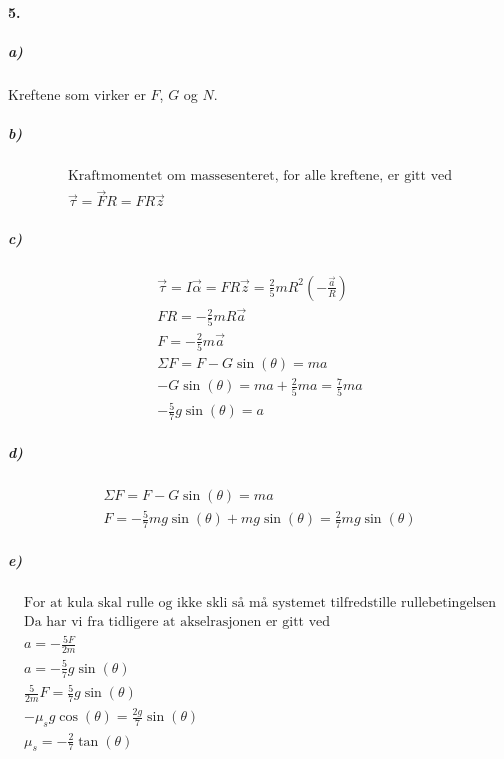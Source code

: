\documentclass[11pt, A4paper,norsk]{article}
\begin{document}
		\paragraph{5.}
			\subparagraph{a)}
				\begin{flushleft}
Kreftene som virker er $F$, $G$ og $N$.
				\end{flushleft}









			\subparagraph{b)}
				\begin{gather*}
\text{Kraftmomentet om massesenteret, for alle kreftene, er gitt ved} \\
\vec{\tau} = \vec{F}R = F R \vec{z}
				\end{gather*}









			\subparagraph{c)}
				\begin{gather*}
\vec{\tau} = I \vec{\alpha} = FR \vec{z} = \frac{2}{5} m R^2 \left( - \frac{\vec{a}}{R} \right) \\
FR = - \frac{2}{5} m R \vec{a} \\
F = - \frac{2}{5} m \vec{a} \\
\Sigma F = F - G \sin(\theta) = ma \\
- G \sin(\theta) = ma + \frac{2}{5} ma = \frac{7}{5} ma \\
- \frac{5}{7} g \sin(\theta) = a
				\end{gather*}









			\subparagraph{d)}
				\begin{gather*}
\Sigma F = F - G \sin(\theta) = ma \\
F = - \frac{5}{7} mg \sin(\theta) + mg \sin(\theta) = \frac{2}{7} mg \sin(\theta)
				\end{gather*}









			\subparagraph{e)}
				\begin{gather*}
\text{For at kula skal rulle og ikke skli så må systemet tilfredstille rullebetingelsen} \\
\text{Da har vi fra tidligere at akselrasjonen er gitt ved} \\
a = - \frac{5F}{2m} \\
a = - \frac{5}{7} g \sin(\theta) \\
\frac{5}{2m} F = \frac{5}{7} g \sin(\theta) \\
- \mu_s g \cos(\theta) = \frac{2g}{7} \sin(\theta) \\
\mu_s = - \frac{2}{7} \tan(\theta)
				\end{gather*}
\end{document}
